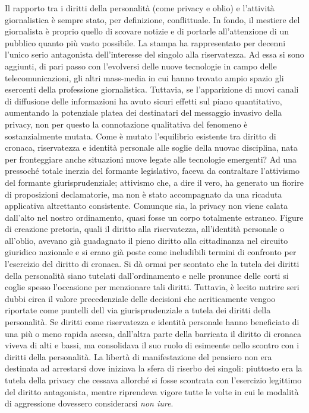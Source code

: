 Il rapporto tra i diritti della personalità (come privacy e oblio) e l'attività giornalistica è sempre stato, per definizione, conflittuale.
In fondo, il mestiere del giornalista è proprio quello di scovare notizie e di portarle all'attenzione di un pubblico quanto più vasto possibile.
La stampa ha rappresentato per decenni l'unico serio antagonista dell'interesse del singolo alla riservatezza. Ad essa si sono aggiunti, di pari passo con l'evolversi delle nuove tecnologie in campo delle telecomunicazioni, gli altri mass-media in cui hanno trovato ampio spazio gli esercenti della professione giornalistica. Tuttavia, se l'apparizione di nuovi canali di diffusione delle informazioni ha avuto sicuri effetti sul piano quantitativo, aumentando la potenziale platea dei destinatari del messaggio invasivo della privacy, non per questo la connotazione qualitativa del fenomeno è sostanzialmente mutata.
Come è mutato l'equilibrio esistente tra diritto di cronaca, riservatezza e identità personale alle soglie della nuovac disciplina, nata per fronteggiare anche situazioni nuove legate alle tecnologie emergenti?
Ad una pressoché totale inerzia del formante legislativo, faceva da contraltare l'attivismo del formante giurisprudenziale; attivismo che, a dire il vero, ha generato un fiorire di proposizioni declamatorie, ma non è stato accompagnato da una ricaduta applicativa altrettanto consistente.
Comunque sia, la privacy non viene calata dall'alto nel nostro ordinamento, quasi fosse un corpo totalmente estraneo. Figure di creazione pretoria, quali il diritto alla riservatezza, all'identità personale o all'oblio, avevano già guadagnato il pieno diritto alla cittadinanza nel circuito giuridico nazionale e si erano già poste come ineludibili termini di confronto per l'esercizio del diritto di cronaca.
Si dà ormai per scontato che la tutela dei diritti della personalità siano tutelati dall'ordinamento e nelle pronunce delle corti si coglie spesso  l'occasione per menzionare tali diritti. Tuttavia, è lecito nutrire seri dubbi circa il valore precedenziale delle decisioni che acriticamente vengoo riportate come puntelli dell via giurisprudenziale a tutela dei diritti della personalità.
Se diritti come riservatezza e identità personale hanno beneficiato di una più o meno rapida ascesa, dall'altra parte della barricata il diritto di cronaca viveva di alti e bassi, ma consolidava il suo ruolo di esimeente nello scontro con i diritti della personalità.
La libertà di manifestazione del pensiero non era destinata ad arrestarsi dove iniziava la sfera di riserbo dei singoli: piuttosto era la tutela della privacy che cessava allorché si fosse scontrata con l'esercizio legittimo del diritto antagonista, mentre riprendeva vigore tutte le volte in cui le modalità di aggressione dovessero considerarsi \textit{non iure}.

